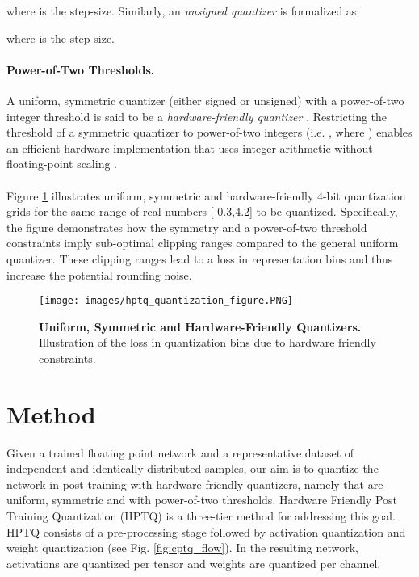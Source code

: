 \documentclass{article}
\begin{document}
where  is the step-size. Similarly, an \textit{unsigned quantizer} is formalized as: 

where  is the step size. 



\paragraph{Power-of-Two Thresholds.}
A uniform, symmetric quantizer (either signed or unsigned) with a power-of-two integer threshold is said to be a \textit{hardware-friendly quantizer} \cite{hmq}. Restricting the threshold of a symmetric quantizer to power-of-two integers (i.e. , where ) enables an efficient hardware implementation that uses integer arithmetic without floating-point scaling \cite{jain2019trained}.






\paragraph{}
Figure \ref{fig:quant_com} illustrates uniform, symmetric and hardware-friendly 4-bit quantization grids for the same range of real numbers [-0.3,4.2] to be quantized. 
Specifically, the figure demonstrates how the symmetry and a power-of-two threshold constraints imply sub-optimal clipping ranges compared to the general uniform quantizer.
These clipping ranges lead to a loss in representation bins and thus increase the potential rounding noise.

\begin{figure}[H]
    \centering
    \texttt{[image: images/hptq\_quantization\_figure.PNG]}
    \caption{\textbf{Uniform, Symmetric and Hardware-Friendly Quantizers.}
    Illustration of the loss in quantization bins due to hardware friendly constraints.}
    \label{fig:quant_com}
\end{figure}
 \section{Method}\label{sec:method}
Given a trained floating point network and a representative dataset  of independent and identically distributed samples, our aim is to quantize the network in post-training with hardware-friendly quantizers, namely that are uniform, symmetric and with power-of-two thresholds. 
Hardware Friendly Post Training Quantization (HPTQ) is a three-tier method for addressing this goal.
HPTQ consists of a pre-processing stage followed by activation quantization and weight quantization (see Fig. \ref{fig:cptq_flow}). 
In the resulting network, activations are quantized per tensor and weights are quantized per channel. 
\end{document}
